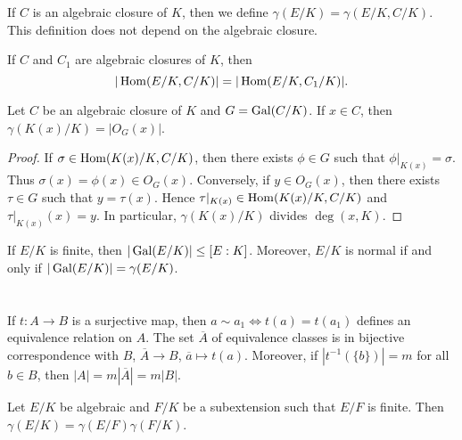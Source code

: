 If $C$ is an algebraic closure of $K$,
then we define $\gamma(E/K)=\gamma(E/K,C/K)$. This definition does
not depend on the algebraic closure. 

\begin{exercise}
\label{xca:gamma_C}
    If $C$ and $C_1$ are algebraic closures of $K$, then
    \[
    |\operatorname{Hom}(E/K,C/K)|=|\operatorname{Hom}(E/K,C_1/K)|.
    \]
\end{exercise}

\begin{proposition}
    Let $C$ be an algebraic closure of $K$ and $G=\operatorname{Gal}(C/K)$. 
    If $x\in C$, then $\gamma(K(x)/K)=|O_G(x)|$. 
\end{proposition}

\begin{proof}
    If $\sigma\in\operatorname{Hom}(K(x)/K,C/K)$, then there exists $\phi\in G$ such that
    $\phi|_{K(x)}=\sigma$. Thus $\sigma(x)=\phi(x)\in O_G(x)$. Conversely,
    if $y\in O_G(x)$, then there exists $\tau\in G$ such that
    $y=\tau(x)$. Hence $\tau|_{K(x)}\in\operatorname{Hom}(K(x)/K,C/K)$ and 
    $\tau|_{K(x)}(x)=y$. In particular, $\gamma(K(x)/K)$ divides $\deg(x,K)$. 
\end{proof}


\begin{exercise}
If $E/K$ is finite, then $|\operatorname{Gal}(E/K)|\leq [E:K]$. Moreover, 
$E/K$ is normal if and only if $|\operatorname{Gal}(E/K)|=\gamma(E/K)$. 
\end{exercise}

\chapter{}

If $t\colon A\to B$ is a surjective map, then 
$a\sim a_1\Longleftrightarrow t(a)=t(a_1)$ 
defines an equivalence relation on $A$. The set $\overline{A}$ 
of equivalence classes is in bijective correspondence with $B$,
$\overline{A}\to B$, $\overline{a}\mapsto t(a)$. 
Moreover, if $|t^{-1}(\{b\})|=m$ for all $b\in B$, then 
$|A|=m|\overline{A}|=m|B|$. 

\begin{proposition}
    Let $E/K$ be algebraic and $F/K$ be a subextension such that 
    $E/F$ is finite. Then $\gamma(E/K)=\gamma(E/F)\gamma(F/K)$. 
\end{proposition}

